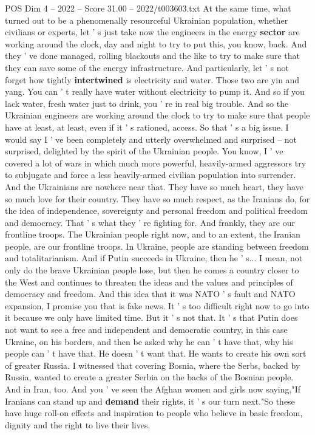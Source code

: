\begin{textsample}{POS Dim 4 – 2022 – Score 31.00 – 2022/t003603.txt}
At the same time, what turned out to be a phenomenally resourceful Ukrainian population, whether civilians or experts, let ' s just take now the engineers in the energy \textbf{sector} are working around the clock, day and night to try to put this, you know, back.
And they ' ve done managed, rolling blackouts and the like to try to make sure that they can save some of the energy infrastructure.
And particularly, let ' s not forget how tightly \textbf{intertwined} is electricity and water.
Those two are yin and yang.
You can ' t really have water without electricity to pump it.
And so if you lack water, fresh water just to drink, you ' re in real big trouble.
And so the Ukrainian engineers are working around the clock to try to make sure that people have at least, at least, even if it ' s rationed, access.
So that ' s a big issue.
I would say I ' ve been completely and utterly overwhelmed and surprised -- not surprised, delighted by the spirit of the Ukrainian people.
You know, I ' ve covered a lot of wars in which much more powerful, heavily-armed aggressors try to subjugate and force a less heavily-armed civilian population into surrender.
And the Ukrainians are nowhere near that.
They have so much heart, they have so much love for their country.
They have so much respect, as the Iranians do, for the idea of independence, sovereignty and personal freedom and political freedom and democracy.
That ' s what they ' re fighting for.
And frankly, they are our frontline troops.
The Ukrainian people right now, and to an extent, the Iranian people, are our frontline troops.
In Ukraine, people are standing between freedom and totalitarianism.
And if Putin succeeds in Ukraine, then he ' s...
I mean, not only do the brave Ukrainian people lose, but then he comes a country closer to the West and continues to threaten the ideas and the values and principles of democracy and freedom.
And this idea that it was NATO ' s fault and NATO expansion, I promise you that is fake news.
It ' s too difficult right now to go into it because we only have limited time.
But it ' s not that.
It ' s that Putin does not want to see a free and independent and democratic country, in this case Ukraine, on his borders, and then be asked why he can ' t have that, why his people can ' t have that.
He doesn ' t want that.
He wants to create his own sort of greater Russia.
I witnessed that covering Bosnia, where the Serbs, backed by Russia, wanted to create a greater Serbia on the backs of the Bosnian people.
And in Iran, too.
And you ' ve seen the Afghan women and girls now saying,"If Iranians can stand up and \textbf{demand} their rights, it ' s our turn next."So these have huge roll-on effects and inspiration to people who believe in basic freedom, dignity and the right to live their lives.

\end{textsample}
